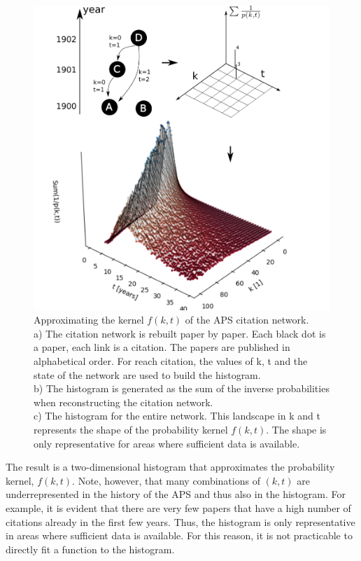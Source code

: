 \documentclass[draft,final]{vutinfth} %
\begin{document}
\begin{figure}[!ht]
	\centering
	 \includegraphics[width=0.8\columnwidth]{figures_aps/newman.png}
	\caption{Approximating the kernel $f(k, t)$ of the APS citation network.\\
	a) The citation network is rebuilt paper by paper. Each black dot is a paper, each link is a citation. The papers are published in alphabetical order. For reach citation, the values of k, t and the state of the network are used to build the histogram.\\
	b) The histogram is generated as the sum of the inverse probabilities when reconstructing the citation network. \\
	c) The histogram for the entire network. This landscape in k and t represents the shape of the probability kernel $f(k, t)$. The shape is only representative for areas where sufficient data is available.
	}
	\label{fig_newman}
\end{figure}

The result is a two-dimensional histogram that approximates the probability kernel, $f(k, t)$. Note, however, that many combinations of $(k, t)$ are underrepresented in the history of the APS and thus also in the histogram. For example, it is evident that there are very few papers that have a high number of citations already in the first few years. Thus, the histogram is only representative in areas where sufficient data is available. For this reason, it is not practicable to directly fit a function to the histogram.
\end{document}

